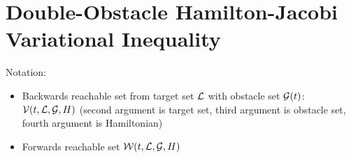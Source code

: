 \section{Double-Obstacle Hamilton-Jacobi Variational Inequality \label{sec:HJIVI}}
Notation:
\begin{itemize}
\item Backwards reachable set from target set $\mathcal{L}$ with obstacle set $\mathcal{G}(t)$: $\mathcal{V}(t, \mathcal{L}, \mathcal{G}, H)$ (second argument is target set, third argument is obstacle set, fourth argument is Hamiltonian)
\item Forwards reachable set $\mathcal{W}(t, \mathcal{L}, \mathcal{G}, H)$
\end{itemize}